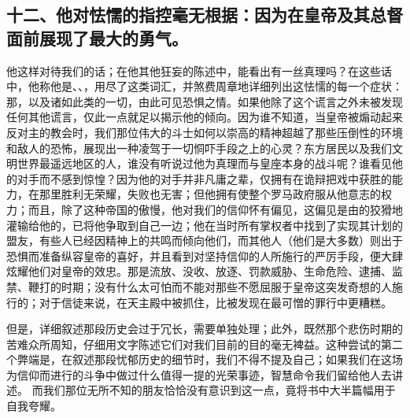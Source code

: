 
\subsection{十二、他对怯懦的指控毫无根据：因为在皇帝及其总督面前展现了最大的勇气。}

他这样对待我们的话；在他其他狂妄的陈述中，能看出有一丝真理吗？在这些话中，他称他是、、，用尽了这类词汇，并煞费周章地详细列出这怯懦的每一个症状：那，以及诸如此类的一切，由此可见恐惧之情。如果他除了这个谎言之外未被发现任何其他谎言，仅此一点就足以揭示他的倾向。因为谁不知道，当皇帝被煽动起来反对主的教会时，我们那位伟大的斗士如何以崇高的精神超越了那些压倒性的环境和敌人的恐怖，展现出一种凌驾于一切恫吓手段之上的心灵？东方居民以及我们文明世界最遥远地区的人，谁没有听说过他为真理而与皇座本身的战斗呢？谁看见他的对手而不感到惊惶？因为他的对手并非凡庸之辈，仅拥有在诡辩把戏中获胜的能力，在那里胜利无荣耀，失败也无害；但他拥有使整个罗马政府服从他意志的权力；而且，除了这种帝国的傲慢，他对我们的信仰怀有偏见，这偏见是由的狡猾地灌输给他的，已将他争取到自己一边；他在当时所有掌权者中找到了实现其计划的盟友，有些人已经因精神上的共鸣而倾向他们，而其他人（他们是大多数）则出于恐惧而准备纵容皇帝的喜好，并且看到对坚持信仰的人所施行的严厉手段，便大肆炫耀他们对皇帝的效忠。那是流放、没收、放逐、罚款威胁、生命危险、逮捕、监禁、鞭打的时期；没有什么太可怕而不能对那些不愿屈服于皇帝这突发奇想的人施行的；对于信徒来说，在天主殿中被抓住，比被发现在最可憎的罪行中更糟糕。\par

但是，详细叙述那段历史会过于冗长，需要单独处理；此外，既然那个悲伤时期的苦难众所周知，仔细用文字陈述它们对我们目前的目的毫无裨益。这种尝试的第二个弊端是，在叙述那段忧郁历史的细节时，我们不得不提及自己；如果我们在这场为信仰而进行的斗争中做过什么值得一提的光荣事迹，智慧命令我们留给他人去讲述。 而我们那位无所不知的朋友恰恰没有意识到这一点，竟将书中大半篇幅用于自我夸耀。\par

